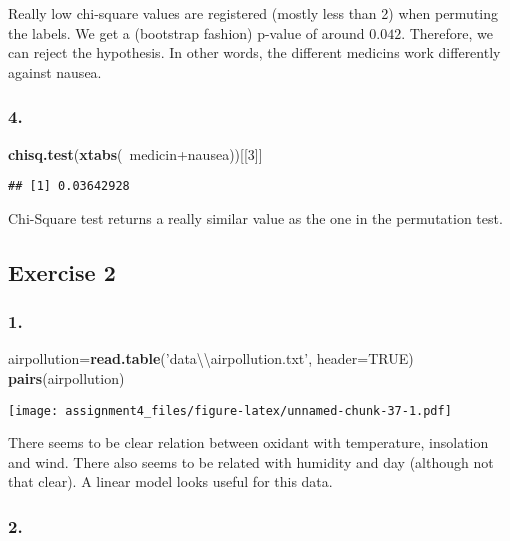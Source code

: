 \documentclass[11pt,]{article}
\newenvironment{Shaded}{\begin{snugshade}}{\end{snugshade}}
\newcommand{\KeywordTok}[1]{\textcolor[rgb]{0.13,0.29,0.53}{\textbf{{#1}}}}
\newcommand{\DataTypeTok}[1]{\textcolor[rgb]{0.13,0.29,0.53}{{#1}}}
\newcommand{\DecValTok}[1]{\textcolor[rgb]{0.00,0.00,0.81}{{#1}}}
\newcommand{\CharTok}[1]{\textcolor[rgb]{0.31,0.60,0.02}{{#1}}}
\newcommand{\StringTok}[1]{\textcolor[rgb]{0.31,0.60,0.02}{{#1}}}
\newcommand{\OtherTok}[1]{\textcolor[rgb]{0.56,0.35,0.01}{{#1}}}
\newcommand{\NormalTok}[1]{{#1}}
\begin{document}
Really low chi-square values are registered (mostly less than 2) when
permuting the labels. We get a (bootstrap fashion) p-value of around
\(0.042\). Therefore, we can reject the hypothesis. In other words, the
different medicins work differently against nausea.

\subsubsection{4.}\label{section-23}

\begin{Shaded}
\begin{Highlighting}[]
\KeywordTok{chisq.test}\NormalTok{(}\KeywordTok{xtabs}\NormalTok{(~medicin+nausea))[[}\DecValTok{3}\NormalTok{]]}
\end{Highlighting}
\end{Shaded}

\begin{verbatim}
## [1] 0.03642928
\end{verbatim}

Chi-Square test returns a really similar value as the one in the
permutation test.

\subsection{Exercise 2}\label{exercise-2-1}

\subsubsection{1.}\label{section-24}

\begin{Shaded}
\begin{Highlighting}[]
\NormalTok{airpollution=}\KeywordTok{read.table}\NormalTok{(}\StringTok{'data}\CharTok{\textbackslash{}\textbackslash{}}\StringTok{airpollution.txt'}\NormalTok{, }\DataTypeTok{header=}\OtherTok{TRUE}\NormalTok{)}
\KeywordTok{pairs}\NormalTok{(airpollution)}
\end{Highlighting}
\end{Shaded}

\texttt{[image: assignment4\_files/figure-latex/unnamed-chunk-37-1.pdf]}

There seems to be clear relation between oxidant with temperature,
insolation and wind. There also seems to be related with humidity and
day (although not that clear). A linear model looks useful for this
data.

\subsubsection{2.}\label{section-25}
\end{document}
